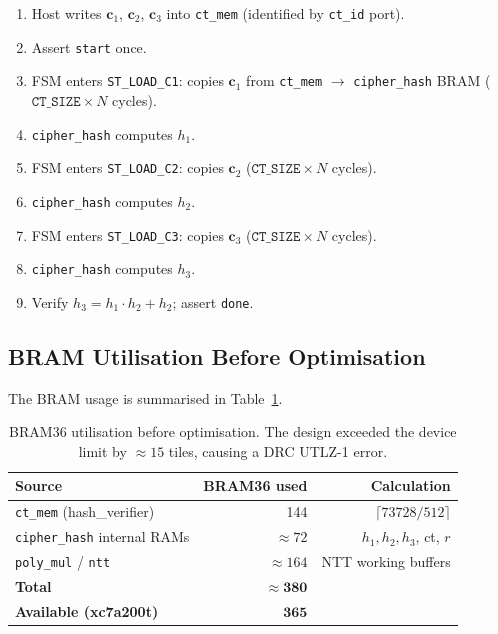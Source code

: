 \documentclass[12pt, a4paper]{article}
\begin{document}
\begin{enumerate}
  \item Host writes $\mathbf{c}_1$, $\mathbf{c}_2$, $\mathbf{c}_3$
        into \texttt{ct\_mem} (identified by \texttt{ct\_id} port).
  \item Assert \texttt{start} once.
  \item FSM enters \texttt{ST\_LOAD\_C1}: copies $\mathbf{c}_1$ from
        \texttt{ct\_mem} $\rightarrow$ \texttt{cipher\_hash} BRAM
        ($\texttt{CT\_SIZE} \times N$ cycles).
  \item \texttt{cipher\_hash} computes $h_1$.
  \item FSM enters \texttt{ST\_LOAD\_C2}: copies $\mathbf{c}_2$
        ($\texttt{CT\_SIZE} \times N$ cycles).
  \item \texttt{cipher\_hash} computes $h_2$.
  \item FSM enters \texttt{ST\_LOAD\_C3}: copies $\mathbf{c}_3$
        ($\texttt{CT\_SIZE} \times N$ cycles).
  \item \texttt{cipher\_hash} computes $h_3$.
  \item Verify $h_3 = h_1 \cdot h_2 + h_2$; assert \texttt{done}.
\end{enumerate}

\subsection{BRAM Utilisation Before Optimisation}

The BRAM usage is summarised in Table~\ref{tab:bram_before}.

\begin{table}[h]
\centering
\begin{tabular}{lrr}
\toprule
\textbf{Source} & \textbf{BRAM36 used} & \textbf{Calculation} \\
\midrule
\texttt{ct\_mem} (hash\_verifier) & 144 & $\lceil 73728 / 512 \rceil$ \\
\texttt{cipher\_hash} internal RAMs & $\approx 72$ & $h_1, h_2, h_3$, ct, $r$ \\
\texttt{poly\_mul} / \texttt{ntt} & $\approx 164$ & NTT working buffers \\
\midrule
\textbf{Total} & $\mathbf{\approx 380}$ & \\
\midrule
\textbf{Available (xc7a200t)} & $\mathbf{365}$ & \\
\bottomrule
\end{tabular}
\caption{BRAM36 utilisation before optimisation. The design exceeded
the device limit by $\approx 15$ tiles, causing a DRC UTLZ-1 error.}
\label{tab:bram_before}
\end{table}
\end{document}
